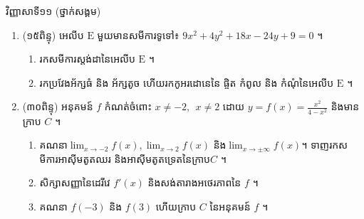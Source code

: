 \documentclass{officialexam}
\begin{document}
 
\newpage 
\maketitle 
\begin{center}
\kml
  វិញ្ញាសាទី១១ ({\kn ថ្នាក់សង្គម})\\
  \end{center}
    \begin{enumerate}[I]




\item (១៥ពិន្ទុ) អេលីប $\mathrm{E}$ មួយមានសមីការទូទៅ៖ $9x^2+4y^2+18x-24y+9=0$ ។ 
\begin{enumerate}[k]
\item រកសមីការស្តង់ដានៃអេលីប $\mathrm{E}$ ។
\item រកប្រវែងអ័ក្សធំ និង អ័ក្សតូច ហើយរកកូអរដោនេនៃ ផ្ចិត កំពូល និង កំណុំនៃអេលីប $\mathrm{E}$ ។
\end{enumerate}
\item (៣០ពិន្ទុ)  អនុគមន៍ $f$ កំណត់ចំពោះ $x\neq -2,\ \ x\neq 2$ ដោយ $y=f(x)=\frac{x^2}{4-x^2}$ និងមានក្រាប $C$ ។ 
		\begin{enumerate}[k]
		\item គណនា$\lim_{x\to -2}f(x), \lim_{x\to 2}f(x)$ និង$\lim_{x\to \pm \infty}f(x)$។   ទាញរកសមីការអាស៊ីមតូតឈរ និងអាស៊ីមតូតទ្រេតនៃក្រាប$C$ ។
		\item សិក្សាសញ្ញានៃដេរីវេ $f'(x)$ និងសង់តារាងអថេរភាពនៃ $f$ ។
		\item គណនា $f(-3)$ និង $f(3)$ ហើយក្រាប $C$ នៃអនុគមន៍ $f$ ។
		\end{enumerate}

\end{enumerate}
\end{document}
